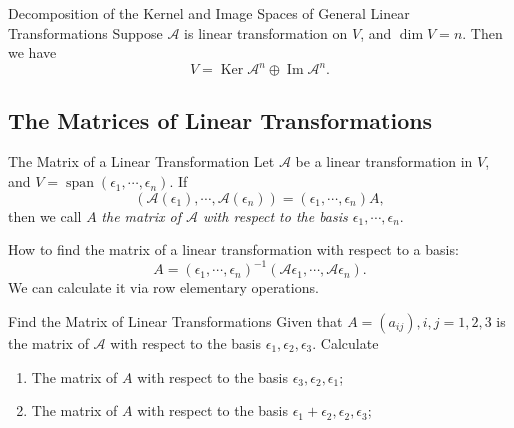 \begin{theorem}{Decomposition of the Kernel and Image Spaces of General Linear Transformations}{}
  Suppose $\mathcal{A}$ is linear transformation on $V$,
  and $\dim V = n$. Then we have
  \begin{equation}
    V = \operatorname{Ker} \mathcal{A}^n \oplus \operatorname{Im} \mathcal{A}^n.
  \end{equation}
\end{theorem}

\subsection{The Matrices of Linear Transformations}

\begin{definition}{The Matrix of a Linear Transformation}{}
  Let $\mathcal{A}$ be a linear transformation in $V$,
  and $V = \operatorname{span} (\epsilon_1,\cdots,\epsilon_n)$.
  If
  \begin{equation}
    (\mathcal{A}(\epsilon_1),\cdots,\mathcal{A}(\epsilon_n)) = (\epsilon_1,\cdots,\epsilon_n)A,
  \end{equation}
  then we call $A$ \emph{the matrix of $\mathcal{A}$ with respect to the basis $\epsilon_1,\cdots,\epsilon_n$}.
\end{definition}

\begin{note}
  How to find the matrix of a linear transformation with respect to a basis:
  \begin{equation}
    A = (\epsilon_1,\cdots,\epsilon_n)^{-1}(\mathcal{A}\epsilon_1,\cdots,\mathcal{A}\epsilon_n).
  \end{equation}
  We can calculate it via row elementary operations.
\end{note}

\begin{example}{Find the Matrix of Linear Transformations}{}
  Given that $A = (a_{ij}), i,j = 1,2,3$ is the matrix of $\mathcal{A}$
  with respect to the basis $\epsilon_1,\epsilon_2,\epsilon_3$. Calculate
  \begin{enumerate}
  \item The matrix of $A$ with respect to the basis $\epsilon_3, \epsilon_2, \epsilon_1$;
  \item The matrix of $A$ with respect to the basis $\epsilon_1 + \epsilon_2, \epsilon_2, \epsilon_3$;
  \end{enumerate}
\end{example}

